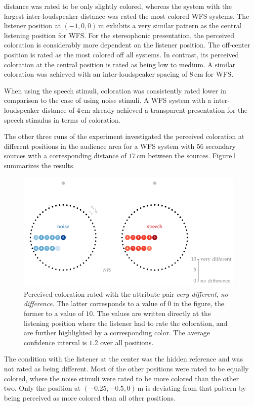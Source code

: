 distance was rated to be only slightly colored, whereas the system with the
largest inter-loudspeaker distance was rated the most colored \ac{WFS} systems. The
listener position at $(-1,0,0)$\,m exhibits a very similar pattern as the
central listening position for \ac{WFS}.
For the stereophonic presentation, the perceived coloration is considerably
more dependent on
the listener position. The off-center position is rated as the most colored off
all systems. In contrast, its
perceived coloration at the central position is rated as being low to medium.
A similar coloration was achieved with an inter-loudspeaker spacing of $8$\,cm for
\ac{WFS}.

When using the speech stimuli, coloration was consistently rated lower in comparison
to the case of using noise stimuli. A \ac{WFS} system with a inter-loudspeaker
distance of $4$\,cm already achieved a transparent presentation for the speech
stimulus in terms of coloration. 

The other three runs of the experiment investigated the perceived
coloration at different positions in the audience area for a \ac{WFS} system
with 56 secondary sources with a corresponding distance
of $17$\,cm between the sources. Figure\,\ref{fig:wfs_coloration_pos} summarizes
the results.
%
\begin{figure}
    \centering
    \hspace*{0.6cm}\includegraphics{fig5_11/fig5_11}
    \caption{Perceived coloration rated with the attribute pair \emph{very
    different}, \emph{no difference}. The latter corresponds to a value of $0$ in
    the figure, the former to a value of $10$. The values are written directly at
    the listening position where the listener had to rate the coloration, and are
    further highlighted by a corresponding color. The average confidence
    interval is $1.2$ over all positions.
    }
    \label{fig:wfs_coloration_pos}
    \vspace{-0.5cm}
\end{figure}
%
The condition with the listener at the center was the hidden reference and was
not rated as being different. Most of the other positions were rated to be
equally colored, where the noise stimuli were rated to be more colored than the
other two.
Only the position at $(-0.25,-0.5,0)$\,m is
deviating from that pattern by being perceived as more colored than all other
positions.



